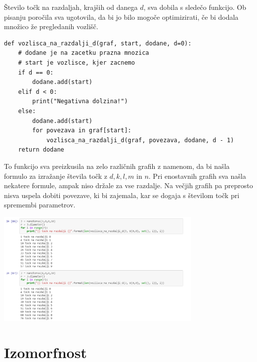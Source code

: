 \documentclass[a4paper, 10 pt, titlepage]{article}
\begin{document}
Število točk na razdaljah, krajših od danega $d$, sva dobila s sledečo funkcijo. Ob pisanju poročila sva ugotovila, da bi jo bilo mogoče optimizirati, če bi dodala množico že pregledanih vozlišč.

\begin{verbatim}
def vozlisca_na_razdalji_d(graf, start, dodane, d=0):
    # dodane je na zacetku prazna mnozica
    # start je vozlisce, kjer zacnemo
    if d == 0:
        dodane.add(start)
    elif d < 0:
        print("Negativna dolzina!")
    else:
        dodane.add(start)
        for povezava in graf[start]:
            vozlisca_na_razdalji_d(graf, povezava, dodane, d - 1)
    return dodane
\end{verbatim}


To funkcijo sva preizkusila na zelo različnih grafih z namenom, da bi našla formulo za izražanje števila točk z $d, k, l, m$ in $n$. Pri enostavnih grafih sva našla nekatere formule, ampak niso držale za vse razdalje. Na večjih grafih pa preprosto nisva uspela dobiti povezave, ki bi zajemala, kar se dogaja s številom točk pri spremembi parametrov. 

\begin{center}
\includegraphics[width=10cm]{tocke}
\end{center}

\pagebreak

\section{Izomorfnost}
\end{document}
